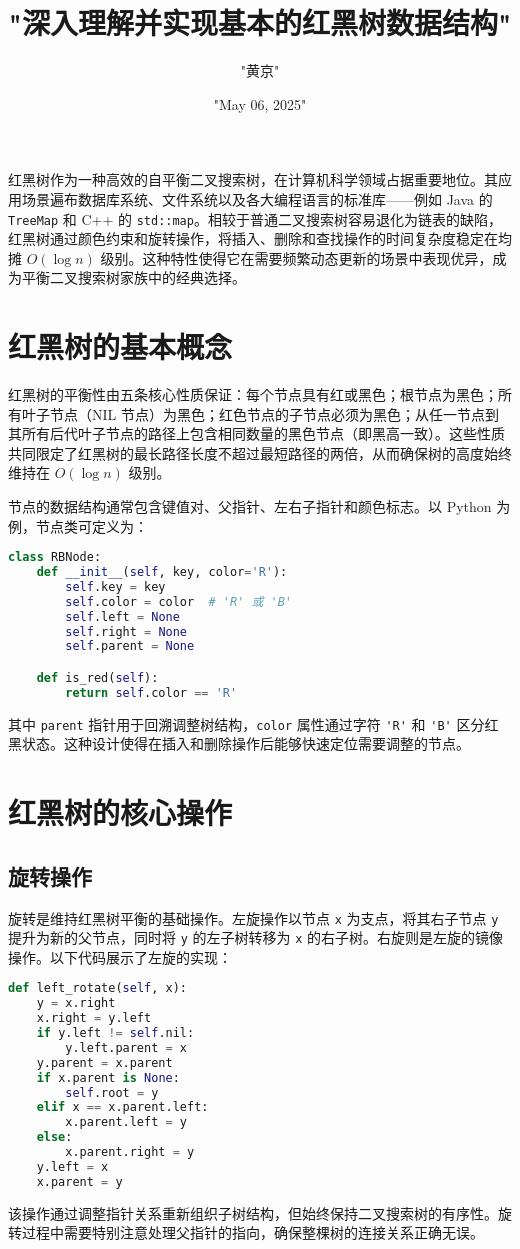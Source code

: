\title{"深入理解并实现基本的红黑树数据结构"}
\author{"黄京"}
\date{"May 06, 2025"}
\maketitle
红黑树作为一种高效的自平衡二叉搜索树，在计算机科学领域占据重要地位。其应用场景遍布数据库系统、文件系统以及各大编程语言的标准库——例如 Java 的 \verb!TreeMap! 和 C++ 的 \verb!std::map!。相较于普通二叉搜索树容易退化为链表的缺陷，红黑树通过颜色约束和旋转操作，将插入、删除和查找操作的时间复杂度稳定在均摊 $O(\log n)$ 级别。这种特性使得它在需要频繁动态更新的场景中表现优异，成为平衡二叉搜索树家族中的经典选择。\par
\chapter{红黑树的基本概念}
红黑树的平衡性由五条核心性质保证：每个节点具有红或黑色；根节点为黑色；所有叶子节点（NIL 节点）为黑色；红色节点的子节点必须为黑色；从任一节点到其所有后代叶子节点的路径上包含相同数量的黑色节点（即黑高一致）。这些性质共同限定了红黑树的最长路径长度不超过最短路径的两倍，从而确保树的高度始终维持在 $O(\log n)$ 级别。\par
节点的数据结构通常包含键值对、父指针、左右子指针和颜色标志。以 Python 为例，节点类可定义为：\par
\begin{lstlisting}[language=python]
class RBNode:
    def __init__(self, key, color='R'):
        self.key = key
        self.color = color  # 'R' 或 'B'
        self.left = None
        self.right = None
        self.parent = None

    def is_red(self):
        return self.color == 'R'
\end{lstlisting}
其中 \verb!parent! 指针用于回溯调整树结构，\verb!color! 属性通过字符 \verb!'R'! 和 \verb!'B'! 区分红黑状态。这种设计使得在插入和删除操作后能够快速定位需要调整的节点。\par
\chapter{红黑树的核心操作}
\section{旋转操作}
旋转是维持红黑树平衡的基础操作。左旋操作以节点 \verb!x! 为支点，将其右子节点 \verb!y! 提升为新的父节点，同时将 \verb!y! 的左子树转移为 \verb!x! 的右子树。右旋则是左旋的镜像操作。以下代码展示了左旋的实现：\par
\begin{lstlisting}[language=python]
def left_rotate(self, x):
    y = x.right
    x.right = y.left
    if y.left != self.nil:
        y.left.parent = x
    y.parent = x.parent
    if x.parent is None:
        self.root = y
    elif x == x.parent.left:
        x.parent.left = y
    else:
        x.parent.right = y
    y.left = x
    x.parent = y
\end{lstlisting}
该操作通过调整指针关系重新组织子树结构，但始终保持二叉搜索树的有序性。旋转过程中需要特别注意处理父指针的指向，确保整棵树的连接关系正确无误。\par

